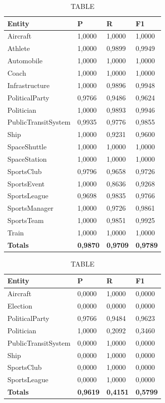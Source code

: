 \documentclass[thesis=M,english]{FITthesis}[2018/05/30]
\begin{document}
\begin{table}[H]\centering
		\caption{TABLE}
		\label{}
		\begin{tabular}{|l|l|l|l|}
			\hline {\textbf{Entity}} & {\textbf{P}} & {\textbf{R}} & {\textbf{F1}}\\\hline
				Aircraft & 1,0000 & 1,0000 & 1,0000\\
				Athlete & 1,0000 & 0,9899 & 0,9949\\
				Automobile & 1,0000 & 1,0000 & 1,0000\\ 
				Coach & 1,0000 & 1,0000 & 1,0000\\
				Infrastructure & 1,0000 & 0,9896 & 0,9948\\
				PoliticalParty & 0,9766 & 0,9486 & 0,9624\\
				Politician & 1,0000 & 0,9893 & 0,9946\\
				PublicTransitSystem & 0,9935 & 0,9776 & 0,9855\\
				Ship & 1,0000 & 0,9231 & 0,9600\\
				SpaceShuttle & 1,0000 & 1,0000 & 1,0000\\
				SpaceStation & 1,0000 & 1,0000 & 1,0000\\ 
				SportsClub & 0,9796 & 0,9658 & 0,9726\\
				SportsEvent & 1,0000 & 0,8636 & 0,9268\\
				SportsLeague & 0,9698 & 0,9835 & 0,9766\\
				SportsManager & 1,0000 & 0,9726 & 0,9861\\
				SportsTeam & 1,0000 & 0,9851 & 0,9925\\
				Train & 1,0000 & 1,0000 & 1,0000\\\hline
				\textbf{Totals} & \textbf{0,9870} & \textbf{0,9709} & \textbf{0,9789}\\\hline
		\end{tabular}
	\end{table}

	\begin{table}[H]\centering
		\caption{TABLE}
		\label{}
		\begin{tabular}{|l|l|l|l|}
			\hline {\textbf{Entity}} & {\textbf{P}} & {\textbf{R}} & {\textbf{F1}}\\\hline
				Aircraft & 0,0000 & 1,0000 & 0,0000\\				
				Election & 0,0000 & 0,0000 & 0,0000\\
				PoliticalParty & 0,9766 & 0,9484 & 0,9623\\
				Politician & 1,0000 & 0,2092 & 0,3460\\
				PublicTransitSystem & 0,0000 & 1,0000 & 0,0000\\
				Ship & 0,0000 & 1,0000 & 0,0000\\
				SportsClub & 0,0000 & 1,0000 & 0,0000\\
				SportsLeague & 0,0000 & 1,0000 & 0,0000\\\hline
				\textbf{Totals} & \textbf{0,9619} & \textbf{0,4151} & \textbf{0,5799}\\\hline
		\end{tabular}
	\end{table}	
\end{document}
